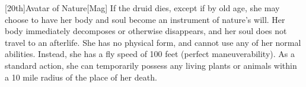 \begin{comment}
    Her accuracy is equal to her druid level \add her Constitution.
    The plants appear on any surface, and will continue to grow if they can survive, though they may die quickly if they appear on inhospitable terrain.
    \subcf{17th -- Flight}
    The druid gains a fly speed equal to her land speed, with good maneuverability.
    She may remain flying for up to 5 rounds at a time.
    After that, she must land for 1 round before she can fly again.
    See \pcref{Flying}, for more details.
    \subcf{17th -- Flaming Soul}
    The druid gains the fire subtype, making her immune to fire but giving her a 50\% vulnerability to cold damage.
    In addition, whenever she deals fire damage to a creature, the creature is \ignited for 5 rounds.
    \subcf{17th -- Sunblessed Rejuvenation}
    The druid gains fast healing equal to her druid level as long as she remains in sunlight or touches a plant of her size or larger.
    \subcf{17th -- Sunscour}
    This aspect functions like the heart of the sun natural aspect, except that it also suppresses shadow effects and the visual components of illusions within the area of bright light.

    \subcf{17th -- Water's Flow}
    As a swift action, the druid can transform herself into a rushing flow of water with a volume roughly equal to her normal volume until the end of her turn.
    In this form, she may move wherever water could go, but she cannot take other actions, such as jumping, attacking, or casting spells.
    Her speed is halved when moving uphill and doubled when moving downhill.
    She may move through squares occupied by creatures or threatened by blocking enemies without penalty.
    She may return to her normal form as a free action.
    \par If the water is split, she may reform from anywhere the water has reached, to as little as a single ounce of water.
    If not even an ounce of water exists contiguously, her body reforms from the largest available parts of water, cut into pieces of appropriate size.
    This usually causes the druid to die.

\end{comment}

    [20th]{Avatar of Nature}[Mag]
    If the druid dies, except if by old age, she may choose to have her body and soul become an instrument of nature's will.
    Her body immediately decomposes or otherwise disappears, and her soul does not travel to an afterlife.
    She has no physical form, and cannot use any of her normal abilities.
    Instead, she has a fly speed of 100 feet (perfect maneuverability).
    As a standard action, she can temporarily possess any living plants or animals within a 10 mile radius of the place of her death.

